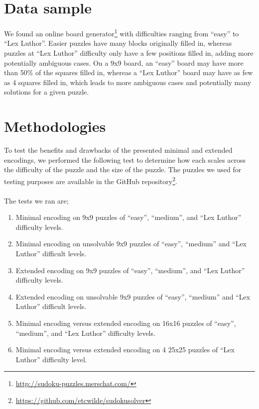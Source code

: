 \documentclass[conference,draftclsnofoot]{IEEEtran}
\begin{document}
\section{Data sample}
We found an online board
generator\footnote{\url{http://sudoku-puzzles.merschat.com/}} with difficulties
ranging from ``easy'' to ``Lex Luthor''. Easier puzzles have many blocks
originally filled in, whereas puzzles at ``Lex Luthor'' difficulty only have a
few positions filled in, adding more potentially ambiguous cases. On a 9x9
board, an ``easy'' board may have more than 50\% of the squares filled in,
whereas a ``Lex Luthor'' board may have as few as 4 squares filled in, which
leads to more ambiguous cases and potentially many solutions for a given
puzzle.

\section{Methodologies}
To test the benefits and drawbacks of the presented minimal and extended
encodings, we performed the following test to determine how each scales across
the difficulty of the puzzle and the size of the puzzle. The puzzles we used
for testing purposes are available in the GitHub
repository\footnote{\url{https://github.com/etcwilde/sudokusolver}}.\\

\\
The tests we ran are;
\begin{enumerate}
	\item Minimal encoding on 9x9 puzzles of ``easy'', ``medium'', and
		``Lex Luthor'' difficulty levels.
	\item Minimal encoding on unsolvable 9x9 puzzles of ``easy'',
		``medium'' and ``Lex Luthor'' difficult levels.
	\item Extended encoding on 9x9 puzzles of ``easy'', ``medium'', and
		``Lex Luthor'' difficulty levels.
	\item Extended encoding on unsolvable 9x9 puzzles of ``easy'',
		``medium'' and ``Lex Luthor'' difficult levels.
	\item Minimal encoding versus extended encoding on 16x16 puzzles of
		``easy'', ``medium'', and ``Lex Luthor'' difficulty levels.
	\item Minimal encoding versus extended encoding on 4 25x25 puzzles of
		``Lex Luthor'' difficulty level.
\end{enumerate}
\end{document}
